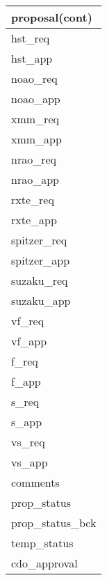 \documentclass{article}
\begin{document}

\begin{tabular}{|l|} \hline
\textbf{proposal(cont)} \\ \hline
hst\_req \\ \hline
hst\_app \\ \hline
noao\_req \\ \hline
noao\_app \\ \hline
xmm\_req \\ \hline
xmm\_app \\ \hline
nrao\_req \\ \hline
nrao\_app \\ \hline
rxte\_req \\ \hline
rxte\_app \\ \hline
spitzer\_req \\ \hline
spitzer\_app \\ \hline
suzaku\_req \\ \hline
suzaku\_app \\ \hline
vf\_req \\ \hline
vf\_app \\ \hline
f\_req  \\ \hline
f\_app  \\ \hline
s\_req  \\ \hline
s\_app  \\ \hline
vs\_req \\ \hline
vs\_app \\ \hline
comments \\ \hline
prop\_status \\ \hline
prop\_status\_bck \\ \hline
temp\_status \\ \hline
cdo\_approval \\ \hline
\end{tabular}
\end{document}
